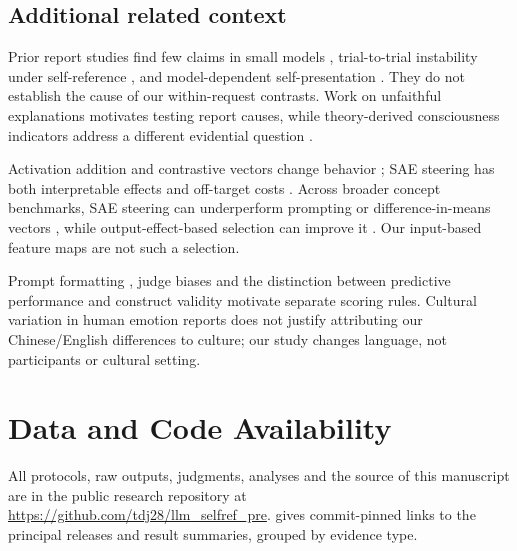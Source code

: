 \documentclass[11pt]{article}
\begin{document}
\subsection{Additional related context}
\label{app:related-context}
Prior report studies find few claims in small models
\citep{kaiser2026sentience}, trial-to-trial instability under self-reference
\citep{balani2026instability}, and model-dependent self-presentation
\citep{plisiecki2026pinocchio,plisiecki2026twoprocess}. They do not establish
the cause of our within-request contrasts. Work on unfaithful explanations
\citep{turpin2023unfaithful} motivates testing report causes, while
theory-derived consciousness indicators address a different evidential
question \citep{butlin2023consciousness}.

Activation addition and contrastive vectors change behavior
\citep{turner2023activation,rimsky2024caa}; SAE steering has both interpretable
effects \citep{templeton2024scaling} and off-target costs
\citep{durmus2024steering}. Across broader concept benchmarks, SAE steering
can underperform prompting or difference-in-means vectors
\citep{wu2025axbench}, while output-effect-based selection can improve it
\citep{arad2025steering}. Our input-based feature maps are not such a selection.

Prompt formatting \citep{sclar2024prompt_sensitivity}, judge biases
\citep{zheng2023llmjudge} and the distinction between predictive performance
and construct validity \citep{plisiecki2026gap} motivate separate scoring
rules. Cultural variation in human emotion reports
\citep{spencerrodgers2010dialecticism} does not justify attributing our
Chinese/English differences to culture; our study changes language, not
participants or cultural setting.

\FloatBarrier
\section{Data and Code Availability}\label{app:provenance}\label{app:ensemble-portability}

All protocols, raw outputs, judgments, analyses and the source of this
manuscript are in the public research repository \citep{jones2026evidence} at
\url{https://github.com/tdj28/llm_selfref_pre}.  gives
commit-pinned links to the principal releases and result summaries,
grouped by evidence type.
\end{document}
